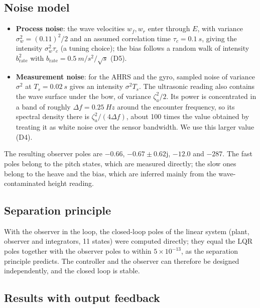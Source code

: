 \documentclass[11pt,a4paper]{article}
\begin{document}
\subsection{Noise model}

\begin{itemize}
\item \textbf{Process noise}: the wave velocities $w_f,w_r$ enter through $E$,
      with variance $\sigma_w^2=(0.11)^2/2$ and an assumed correlation time
      $\tau_c=\SI{0.1}{s}$, giving the intensity $\sigma_w^2\tau_c$ (a tuning
      choice);
      the bias follows a random walk of intensity $b_{\mathrm{rate}}^2$ with
      $b_{\mathrm{rate}}=\SI{0.5}{m/s^2/\sqrt{s}}$ (D5).
\item \textbf{Measurement noise}: for the AHRS and the gyro, sampled noise of
      variance $\sigma^2$ at $T_s=\SI{0.02}{s}$ gives an intensity
      $\sigma^2T_s$. The ultrasonic reading also contains the wave surface under
      the bow, of variance $\zeta_a^2/2$. Its power is concentrated in a band of
      roughly $\Delta f=\SI{0.25}{Hz}$ around the encounter frequency, so its
      spectral density there is $\zeta_a^2/(4\Delta f)$, about 100 times the value
      obtained by treating it as white noise over the sensor bandwidth. We use
      this larger value (D4).
\end{itemize}

The resulting observer poles are $-0.66$, $-0.67\pm0.62\mathrm{j}$, $-12.0$ and
$-287$. The fast poles belong to the pitch states, which are measured directly;
the slow ones belong to the heave and the bias, which are inferred mainly from
the wave-contaminated height reading.

\subsection{Separation principle}

With the observer in the loop, the closed-loop poles of the linear system
(plant, observer and integrators, 11 states) were computed directly; they equal
the LQR poles together with the observer poles to within $5\times10^{-13}$, as
the separation principle predicts. The controller and the observer can
therefore be designed independently, and the closed loop is stable.

\subsection{Results with output feedback}
\end{document}
